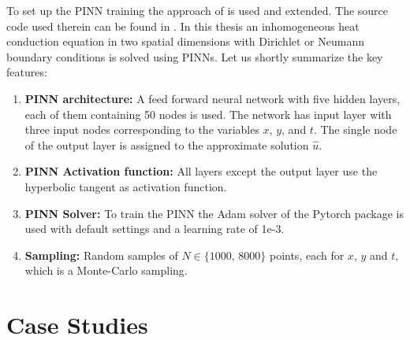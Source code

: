 \documentclass[a4paper,11pt]{article}
\begin{document}
To set up the PINN training the approach of \cite{aryal2024a} is used and extended. The source code used therein can be found in \cite{aryal2024b}. In this thesis an inhomogeneous heat conduction equation in two spatial dimensions with Dirichlet or Neumann boundary conditions is solved using PINNs. Let us shortly summarize the key features:
\begin{enumerate}
\item {\bf PINN architecture:} A feed forward neural network with five hidden layers, each of them containing 50 nodes is used. The network has input layer with three input nodes corresponding to the variables $x$, $y$, and $t$. The single node of the output layer is assigned to the approximate solution $\hat{u}$. 
\item {\bf PINN Activation function:} All layers except the output layer use the hyperbolic tangent as activation function.
\item {\bf PINN Solver:} To train the PINN the Adam solver of the Pytorch package is used with default settings and a learning rate of 1e-3.
\item {\bf Sampling:} Random samples of $N \in \{ 1000,\, 8000 \} $ points, each for $x$, $y$ and $t$, which is a Monte-Carlo sampling.
\end{enumerate}
\section{Case Studies}
\end{document}
